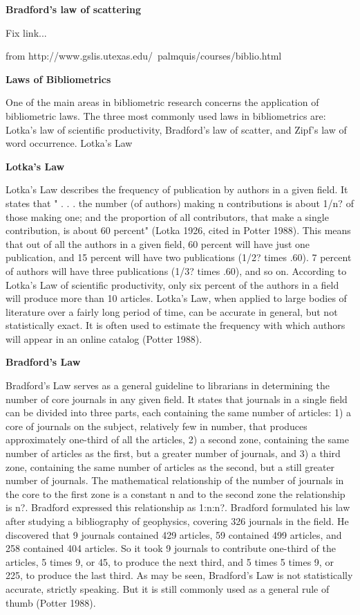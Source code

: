   \textbf{Bradford's law of scattering}

  Fix link...

  

  from
http://www.gslis.utexas.edu/~palmquis/courses/biblio.html


  \textbf{Laws of Bibliometrics}

  One of the main areas in bibliometric research concerns the
  application of bibliometric laws. The three most commonly used laws in
  bibliometrics are: Lotka's law of scientific productivity, Bradford's
  law of scatter, and Zipf's law of word occurrence.  Lotka's Law


  \textbf{Lotka's Law}

  Lotka's Law describes the frequency of publication by authors in a
  given field. It states that " . . . the number (of authors) making n
  contributions is about 1/n? of those making one; and the proportion
  of all contributors, that make a single contribution, is about 60
  percent" (Lotka 1926, cited in Potter 1988). This means that out of
  all the authors in a given field, 60 percent will have just one
  publication, and 15 percent will have two publications (1/2? times
  .60). 7 percent of authors will have three publications (1/3? times
  .60), and so on. According to Lotka's Law of scientific
  productivity, only six percent of the authors in a field will
  produce more than 10 articles. Lotka's Law, when applied to large
  bodies of literature over a fairly long period of time, can be
  accurate in general, but not statistically exact. It is often used
  to estimate the frequency with which authors will appear in an
  online catalog (Potter 1988).


  \textbf{Bradford's Law}

  Bradford's Law serves as a general guideline to librarians in
  determining the number of core journals in any given field. It states
  that journals in a single field can be divided into three parts, each
  containing the same number of articles: 1) a core of journals on the
  subject, relatively few in number, that produces approximately
  one-third of all the articles, 2) a second zone, containing the same
  number of articles as the first, but a greater number of journals, and
  3) a third zone, containing the same number of articles as the second,
  but a still greater number of journals. The mathematical relationship
  of the number of journals in the core to the first zone is a constant
  n and to the second zone the relationship is n?. Bradford expressed
  this relationship as 1:n:n?. Bradford formulated his law after
  studying a bibliography of geophysics, covering 326 journals in the
  field. He discovered that 9 journals contained 429 articles, 59
  contained 499 articles, and 258 contained 404 articles. So it took 9
  journals to contribute one-third of the articles, 5 times 9, or 45, to
  produce the next third, and 5 times 5 times 9, or 225, to produce the
  last third. As may be seen, Bradford's Law is not statistically
  accurate, strictly speaking. But it is still commonly used as a
  general rule of thumb (Potter 1988).


